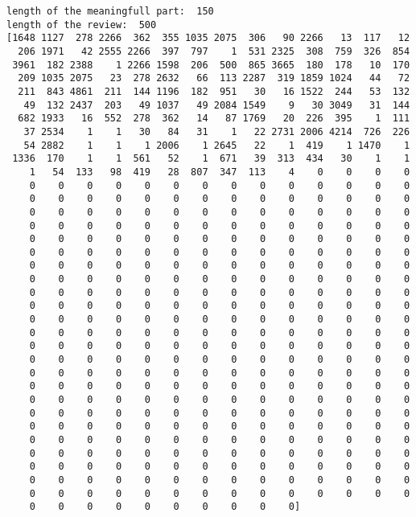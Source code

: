 \documentclass[11pt]{article}
\begin{document}
    \begin{Verbatim}[commandchars=\\\{\}]
length of the meaningfull part:  150
length of the review:  500
[1648 1127  278 2266  362  355 1035 2075  306   90 2266   13  117   12
  206 1971   42 2555 2266  397  797    1  531 2325  308  759  326  854
 3961  182 2388    1 2266 1598  206  500  865 3665  180  178   10  170
  209 1035 2075   23  278 2632   66  113 2287  319 1859 1024   44   72
  211  843 4861  211  144 1196  182  951   30   16 1522  244   53  132
   49  132 2437  203   49 1037   49 2084 1549    9   30 3049   31  144
  682 1933   16  552  278  362   14   87 1769   20  226  395    1  111
   37 2534    1    1   30   84   31    1   22 2731 2006 4214  726  226
   54 2882    1    1    1 2006    1 2645   22    1  419    1 1470    1
 1336  170    1    1  561   52    1  671   39  313  434   30    1    1
    1   54  133   98  419   28  807  347  113    4    0    0    0    0
    0    0    0    0    0    0    0    0    0    0    0    0    0    0
    0    0    0    0    0    0    0    0    0    0    0    0    0    0
    0    0    0    0    0    0    0    0    0    0    0    0    0    0
    0    0    0    0    0    0    0    0    0    0    0    0    0    0
    0    0    0    0    0    0    0    0    0    0    0    0    0    0
    0    0    0    0    0    0    0    0    0    0    0    0    0    0
    0    0    0    0    0    0    0    0    0    0    0    0    0    0
    0    0    0    0    0    0    0    0    0    0    0    0    0    0
    0    0    0    0    0    0    0    0    0    0    0    0    0    0
    0    0    0    0    0    0    0    0    0    0    0    0    0    0
    0    0    0    0    0    0    0    0    0    0    0    0    0    0
    0    0    0    0    0    0    0    0    0    0    0    0    0    0
    0    0    0    0    0    0    0    0    0    0    0    0    0    0
    0    0    0    0    0    0    0    0    0    0    0    0    0    0
    0    0    0    0    0    0    0    0    0    0    0    0    0    0
    0    0    0    0    0    0    0    0    0    0    0    0    0    0
    0    0    0    0    0    0    0    0    0    0    0    0    0    0
    0    0    0    0    0    0    0    0    0    0    0    0    0    0
    0    0    0    0    0    0    0    0    0    0    0    0    0    0
    0    0    0    0    0    0    0    0    0    0    0    0    0    0
    0    0    0    0    0    0    0    0    0    0    0    0    0    0
    0    0    0    0    0    0    0    0    0    0    0    0    0    0
    0    0    0    0    0    0    0    0    0    0    0    0    0    0
    0    0    0    0    0    0    0    0    0    0    0    0    0    0
    0    0    0    0    0    0    0    0    0    0]

    \end{Verbatim}
\end{document}
